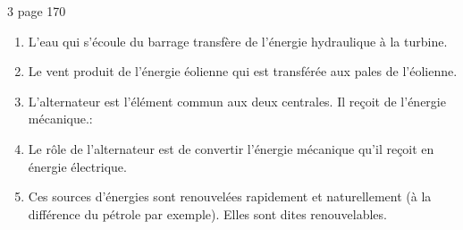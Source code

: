 \begin{myact}{3 page 170}
	\begin{enumerate}
		\item L'eau qui s'écoule du barrage transfère de l'énergie hydraulique à la turbine.\pause
		\item Le vent produit de l'énergie éolienne qui est transférée aux pales de l'éolienne.\pause
		\item L'alternateur est l'élément commun aux deux centrales. Il reçoit de l'énergie mécanique.:\pause
		\item Le rôle de l'alternateur est de convertir l'énergie mécanique qu'il reçoit en énergie électrique.\pause
		\item Ces sources d'énergies sont renouvelées rapidement et naturellement (à la différence du pétrole par exemple). Elles sont dites renouvelables.
	\end{enumerate}
\end{myact}